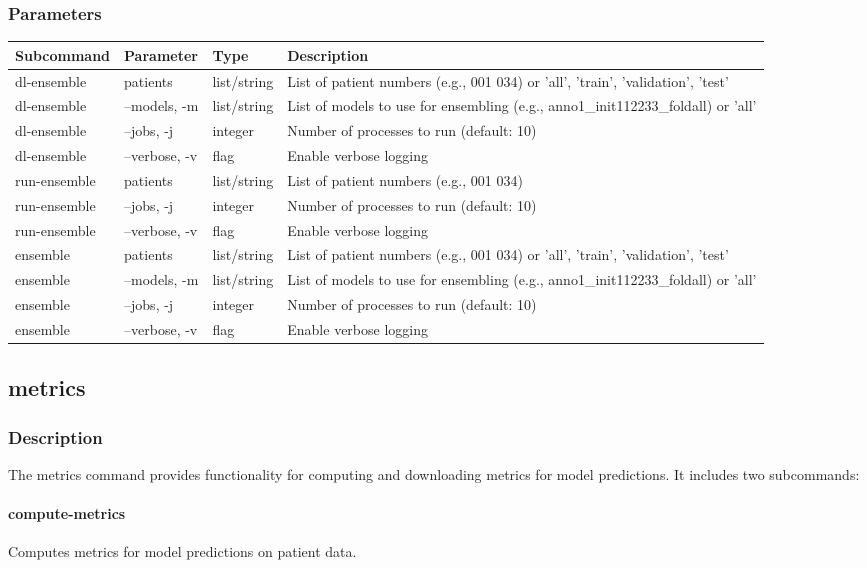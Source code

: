 \documentclass{article}
\begin{document}
\subsubsection{Parameters}
\begin{tabulary}{\linewidth}{LLLL}
\toprule
\textbf{Subcommand} & \textbf{Parameter} & \textbf{Type} & \textbf{Description} \\
\midrule
dl-ensemble & patients & list/string & List of patient numbers (e.g., 001 034) or 'all', 'train', 'validation', 'test' \\
dl-ensemble & --models, -m & list/string & List of models to use for ensembling (e.g., anno1\_init112233\_foldall) or 'all' \\
dl-ensemble & --jobs, -j & integer & Number of processes to run (default: 10) \\
dl-ensemble & --verbose, -v & flag & Enable verbose logging \\
\midrule
run-ensemble & patients & list/string & List of patient numbers (e.g., 001 034) \\
run-ensemble & --jobs, -j & integer & Number of processes to run (default: 10) \\
run-ensemble & --verbose, -v & flag & Enable verbose logging \\
\midrule
ensemble & patients & list/string & List of patient numbers (e.g., 001 034) or 'all', 'train', 'validation', 'test' \\
ensemble & --models, -m & list/string & List of models to use for ensembling (e.g., anno1\_init112233\_foldall) or 'all' \\
ensemble & --jobs, -j & integer & Number of processes to run (default: 10) \\
ensemble & --verbose, -v & flag & Enable verbose logging \\
\bottomrule
\end{tabulary}

\subsection{metrics}
\subsubsection{Description}
The metrics command provides functionality for computing and downloading metrics for model predictions. It includes two subcommands:

\paragraph{compute-metrics}
Computes metrics for model predictions on patient data.
\end{document}
